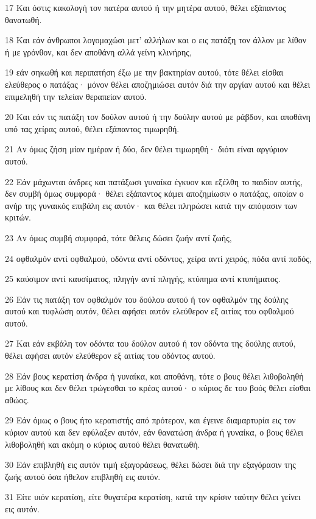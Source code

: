 \par 17 Και όστις κακολογή τον πατέρα αυτού ή την μητέρα αυτού, θέλει εξάπαντος θανατωθή.
\par 18 Και εάν άνθρωποι λογομαχώσι μετ' αλλήλων και ο εις πατάξη τον άλλον με λίθον ή με γρόνθον, και δεν αποθάνη αλλά γείνη κλινήρης,
\par 19 εάν σηκωθή και περιπατήση έξω με την βακτηρίαν αυτού, τότε θέλει είσθαι ελεύθερος ο πατάξας· μόνον θέλει αποζημιώσει αυτόν διά την αργίαν αυτού και θέλει επιμεληθή την τελείαν θεραπείαν αυτού.
\par 20 Και εάν τις πατάξη τον δούλον αυτού ή την δούλην αυτού με ράβδον, και αποθάνη υπό τας χείρας αυτού, θέλει εξάπαντος τιμωρηθή.
\par 21 Αν όμως ζήση μίαν ημέραν ή δύο, δεν θέλει τιμωρηθή· διότι είναι αργύριον αυτού.
\par 22 Εάν μάχωνται άνδρες και πατάξωσι γυναίκα έγκυον και εξέλθη το παιδίον αυτής, δεν συμβή όμως συμφορά· θέλει εξάπαντος κάμει αποζημίωσιν ο πατάξας, οποίαν ο ανήρ της γυναικός επιβάλη εις αυτόν· και θέλει πληρώσει κατά την απόφασιν των κριτών.
\par 23 Αν όμως συμβή συμφορά, τότε θέλεις δώσει ζωήν αντί ζωής,
\par 24 οφθαλμόν αντί οφθαλμού, οδόντα αντί οδόντος, χείρα αντί χειρός, πόδα αντί ποδός,
\par 25 καύσιμον αντί καυσίματος, πληγήν αντί πληγής, κτύπημα αντί κτυπήματος.
\par 26 Εάν τις πατάξη τον οφθαλμόν του δούλου αυτού ή τον οφθαλμόν της δούλης αυτού και τυφλώση αυτόν, θέλει αφήσει αυτόν ελεύθερον εξ αιτίας του οφθαλμού αυτού.
\par 27 Και εάν εκβάλη τον οδόντα του δούλον αυτού ή τον οδόντα της δούλης αυτού, θέλει αφήσει αυτόν ελεύθερον εξ αιτίας του οδόντος αυτού.
\par 28 Εάν βους κερατίση άνδρα ή γυναίκα, και αποθάνη, τότε ο βους θέλει λιθοβοληθή με λίθους και δεν θέλει τρώγεσθαι το κρέας αυτού· ο κύριος δε του βοός θέλει είσθαι αθώος.
\par 29 Εάν όμως ο βους ήτο κερατιστής από πρότερον, και έγεινε διαμαρτυρία εις τον κύριον αυτού και δεν εφύλαξεν αυτόν, εάν θανατώση άνδρα ή γυναίκα, ο βους θέλει λιθοβοληθή και ακόμη ο κύριος αυτού θέλει θανατωθή.
\par 30 Εάν επιβληθή εις αυτόν τιμή εξαγοράσεως, θέλει δώσει διά την εξαγόρασιν της ζωής αυτού όσα ήθελον επιβληθή εις αυτόν.
\par 31 Είτε υιόν κερατίση, είτε θυγατέρα κερατίση, κατά την κρίσιν ταύτην θέλει γείνει εις αυτόν.
